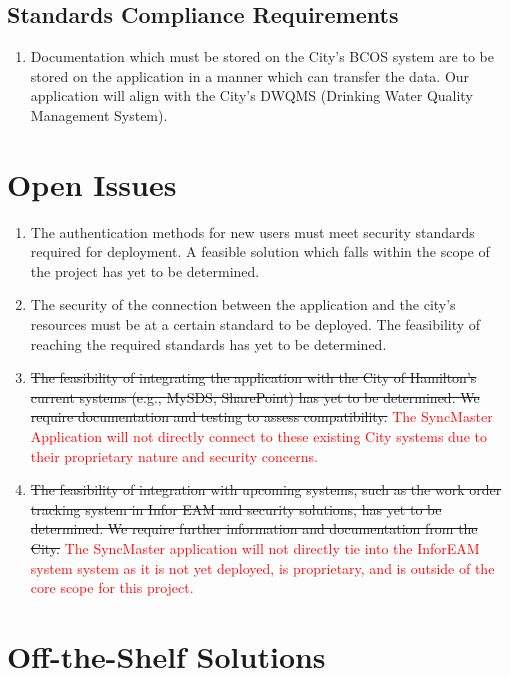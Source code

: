\documentclass[12pt]{article}
\begin{document}
\subsection{Standards Compliance Requirements}
\begin{enumerate}[{CR-S}1.]
  \item Documentation which must be stored on the City's BCOS
    system are to be stored on the application in a manner which can
    transfer the data. Our application will align with the City's
    DWQMS (Drinking Water Quality Management System).
\end{enumerate}

\section{Open Issues}
\begin{enumerate}
  \item The authentication methods for new users must meet security
    standards required for deployment. A feasible solution which
    falls within the scope of the project has yet to be determined.
  \item The security of the connection between the application and
    the city's resources must be at a certain standard to be
    deployed. The feasibility of reaching the required standards has
    yet to be determined.
  \item \sout{The feasibility of integrating the application with the City
    of Hamilton's current systems (e.g., MySDS, SharePoint) has yet
    to be determined. We require documentation and testing to assess
    compatibility.} \textcolor{red}{The SyncMaster Application will not directly connect to these existing
    City systems due to their proprietary nature and security concerns.}
  \item \sout{The feasibility of integration with upcoming systems, such as
    the work order tracking system in Infor EAM and security
    solutions, has yet to be determined. We require further
    information and documentation from the City.} \textcolor{red}{The SyncMaster application will not directly tie into the InforEAM system
    system as it is not yet deployed, is proprietary, and is outside of the core scope for this project.}
\end{enumerate}

\section{Off-the-Shelf Solutions}
\end{document}
